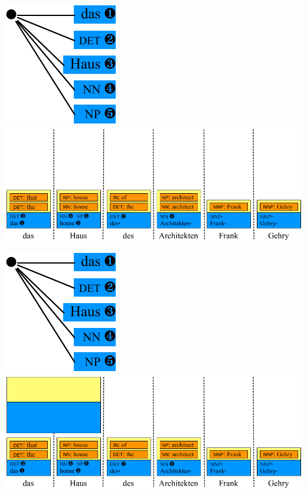 \documentclass[landscape]{slides}
\begin{document}

\begin{center}\vspace{9mm}
\includegraphics[scale=1.4]{accessing-grammar-rules-prefix-early5.pdf}\\[-1mm]
\includegraphics[scale=1.4]{accessing-grammar-rules-early-example8.pdf}
\end{center}


\begin{center}\vspace{7mm}
\includegraphics[scale=1.4]{accessing-grammar-rules-prefix-early5.pdf}\\[-1mm]
\includegraphics[scale=1.4]{accessing-grammar-rules-early-example9.pdf}
\end{center}
\end{document}
